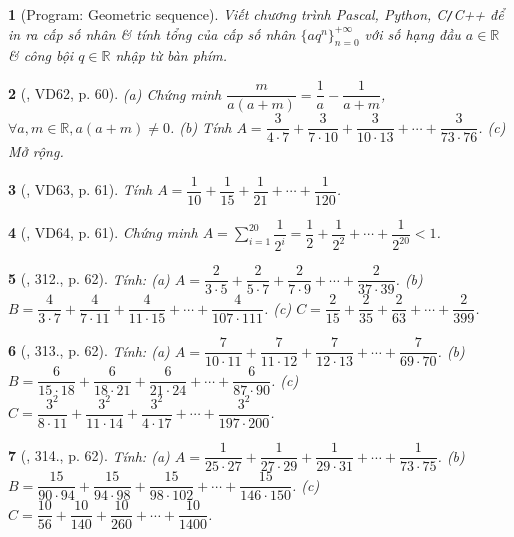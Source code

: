 \documentclass{article}
\newtheorem{baitoan}{}
\begin{document}
\begin{baitoan}[{\sf Program}: Geometric sequence]
	Viết chương trình {\sf Pascal, Python, C{\tt/}C++} để in ra cấp số nhân \& tính tổng của cấp số nhân $\{aq^n\}_{n=0}^{+\infty}$ với số hạng đầu $a\in\mathbb{R}$ \& công bội $q\in\mathbb{R}$ nhập từ bàn phím.
\end{baitoan}

\begin{baitoan}[\cite{Tuyen_Toan_6}, VD62, p. 60]
	(a) Chứng minh $\dfrac{m}{a(a + m)} = \dfrac{1}{a} - \dfrac{1}{a + m}$, $\forall a,m\in\mathbb{R},a(a + m)\ne0$. (b) Tính $A = \dfrac{3}{4\cdot7} + \dfrac{3}{7\cdot10} + \dfrac{3}{10\cdot13} + \cdots + \dfrac{3}{73\cdot76}$. (c) Mở rộng.
\end{baitoan}

\begin{baitoan}[\cite{Tuyen_Toan_6}, VD63, p. 61]
	Tính $A = \dfrac{1}{10} + \dfrac{1}{15} + \dfrac{1}{21} + \cdots + \dfrac{1}{120}$.
\end{baitoan}

\begin{baitoan}[\cite{Tuyen_Toan_6}, VD64, p. 61]
	Chứng minh $A = \sum_{i=1}^{20} \dfrac{1}{2^i} = \dfrac{1}{2} + \dfrac{1}{2^2} + \cdots + \dfrac{1}{2^{20}} < 1$.
\end{baitoan}

\begin{baitoan}[\cite{Tuyen_Toan_6}, 312., p. 62]
	Tính: (a) $A = \dfrac{2}{3\cdot5} + \dfrac{2}{5\cdot7} + \dfrac{2}{7\cdot9} + \cdots + \dfrac{2}{37\cdot39}$. (b) $B = \dfrac{4}{3\cdot7} + \dfrac{4}{7\cdot11} + \dfrac{4}{11\cdot15} + \cdots + \dfrac{4}{107\cdot111}$. (c) $C = \dfrac{2}{15} + \dfrac{2}{35} + \dfrac{2}{63} + \cdots + \dfrac{2}{399}$.
\end{baitoan}

\begin{baitoan}[\cite{Tuyen_Toan_6}, 313., p. 62]
	Tính: (a) $A = \dfrac{7}{10\cdot11} + \dfrac{7}{11\cdot12} + \dfrac{7}{12\cdot13} + \cdots + \dfrac{7}{69\cdot70}$. (b) $B = \dfrac{6}{15\cdot18} + \dfrac{6}{18\cdot21} + \dfrac{6}{21\cdot24} + \cdots + \dfrac{6}{87\cdot90}$. (c) $C = \dfrac{3^2}{8\cdot11} + \dfrac{3^2}{11\cdot14} + \dfrac{3^2}{4\cdot17} + \cdots + \dfrac{3^2}{197\cdot200}$.
\end{baitoan}

\begin{baitoan}[\cite{Tuyen_Toan_6}, 314., p. 62]
	Tính: (a) $A = \dfrac{1}{25\cdot27} + \dfrac{1}{27\cdot29} + \dfrac{1}{29\cdot31} + \cdots + \dfrac{1}{73\cdot75}$. (b) $B = \dfrac{15}{90\cdot94} + \dfrac{15}{94\cdot98} + \dfrac{15}{98\cdot102} + \cdots + \dfrac{15}{146\cdot150}$. (c) $C = \dfrac{10}{56} + \dfrac{10}{140} + \dfrac{10}{260} + \cdots + \dfrac{10}{1400}$.
\end{baitoan}
\end{document}
